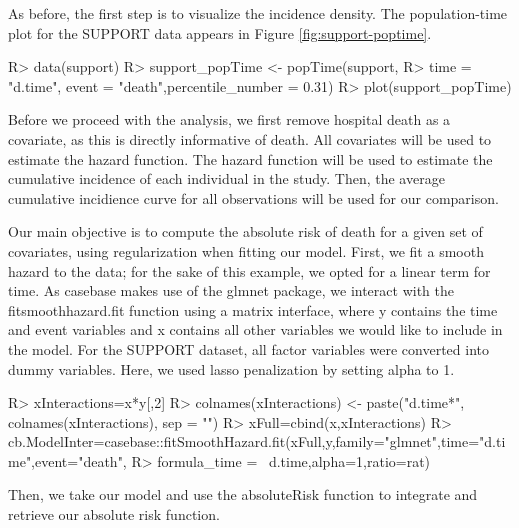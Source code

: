\documentclass[
]{jss}
\begin{document}
As before, the first step is to visualize the incidence density. The
population-time plot for the SUPPORT data appears in Figure
\ref{fig:support-poptime}.

\begin{CodeChunk}

\begin{CodeInput}
R> data(support)
R> support_popTime <- popTime(support,
R>                            time = "d.time", event = "death",percentile_number = 0.31)
R> plot(support_popTime)
\end{CodeInput}
\end{CodeChunk}

Before we proceed with the analysis, we first remove hospital death as a
covariate, as this is directly informative of death. All covariates will
be used to estimate the hazard function. The hazard function will be
used to estimate the cumulative incidence of each individual in the
study. Then, the average cumulative incidience curve for all
observations will be used for our comparison.

Our main objective is to compute the absolute risk of death for a given
set of covariates, using regularization when fitting our model. First,
we fit a smooth hazard to the data; for the sake of this example, we
opted for a linear term for time. As casebase makes use of the glmnet
package, we interact with the fitsmoothhazard.fit function using a
matrix interface, where y contains the time and event variables and x
contains all other variables we would like to include in the model. For
the SUPPORT dataset, all factor variables were converted into dummy
variables. Here, we used lasso penalization by setting alpha to 1.

\begin{CodeChunk}

\begin{CodeInput}
R> xInteractions=x*y[,2]
R> colnames(xInteractions) <- paste("d.time*", colnames(xInteractions), sep = "")
R> xFull=cbind(x,xInteractions)
R> cb.ModelInter=casebase::fitSmoothHazard.fit(xFull,y,family="glmnet",time="d.time",event="death",
R>                                        formula_time = ~d.time,alpha=1,ratio=rat)
\end{CodeInput}
\end{CodeChunk}

Then, we take our model and use the absoluteRisk function to integrate
and retrieve our absolute risk function.

\begin{CodeChunk}

\end{CodeChunk}
\end{document}
